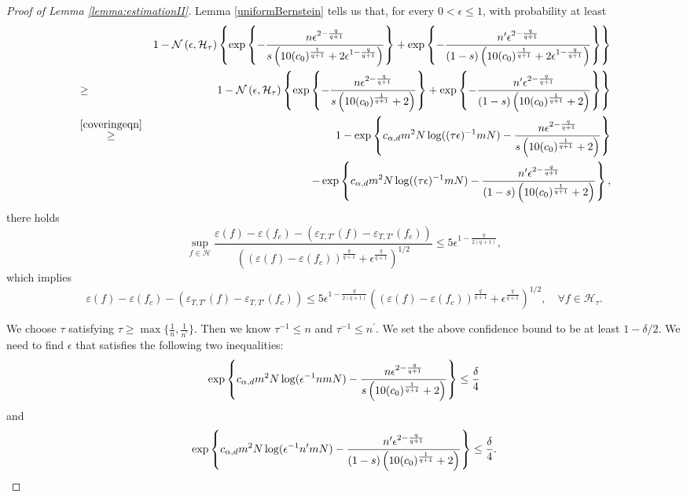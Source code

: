 \documentclass[10pt,a4paper]{amsart}
\begin{document}
\begin{proof}[Proof of Lemma \ref{lemma:estimationII}]
    Lemma \ref{uniformBernstein} tells us that, for every $0<\epsilon \leq 1$, with probability at least 
    \begin{eqnarray*}
&&1-  {\mathcal N}\left(\epsilon, {\mathcal H_\tau}\right) \left\{\exp \left\{-
{n \epsilon^{2-{\frac{q}{q+1}}} \over s\left(10 (c_0)^{\frac{1}{q+1}} +2 \epsilon^{1-{\frac{q}{q+1}}}\right)}\right\}
+\exp \left\{-
{n' \epsilon^{2-{\frac{q}{q+1}}} \over (1-s) \left(10 (c_0)^{\frac{1}{q+1}} +2 \epsilon^{1-{\frac{q}{q+1}}}\right)}\right\}\right\}\\
&\geq& 1-  {\mathcal N}\left(\epsilon, {\mathcal H_\tau}\right) \left\{\exp \left\{-
{n \epsilon^{2-{\frac{q}{q+1}}} \over s\left(10 (c_0)^{\frac{1}{q+1}} +2 \right)}\right\} +\exp \left\{-
{n' \epsilon^{2-{\frac{q}{q+1}}} \over (1-s) \left(10 (c_0)^{\frac{1}{q+1}} +2 \right)}\right\}\right\}\\
&\stackrel{\eqref{coveringeqn}}{\geq}& 1- \exp \left\{c_{\alpha, d} m^2 N \log ((\tau\epsilon)^{-1}mN) -
{n \epsilon^{2-{\frac{q}{q+1}}} \over s\left(10 (c_0)^{\frac{1}{q+1}} +2 \right)}\right\}\\
&& -\exp \left\{c_{\alpha, d} m^2 N \log ((\tau\epsilon)^{-1}mN)-
{n' \epsilon^{2-{\frac{q}{q+1}}} \over (1-s) \left(10 (c_0)^{\frac{1}{q+1}} +2 \right)}\right\} ,
\end{eqnarray*} 
there holds
$$\sup_{f\in {\mathcal H}} \frac{\varepsilon (f) - \varepsilon (f_c) - \left(\varepsilon_{T, T'} (f) - \varepsilon_{T, T'} (f_c)\right)}{\left(\left(\varepsilon (f) - \varepsilon (f_c)\right)^{\frac{q}{q+1}} + \epsilon^{\frac{q}{q+1}}\right)^{1/2}} \leq 5 \epsilon^{1-{\frac{q}{2(q+1)}}},
$$
which implies 
\begin{equation}\label{5epsilon}
    \varepsilon (f) - \varepsilon (f_c) - \left(\varepsilon_{T, T'} (f) - \varepsilon_{T, T'} (f_c)\right)\leq 5 \epsilon^{1-{\frac{q}{2(q+1)}}}\left(\left(\varepsilon (f) - \varepsilon (f_c)\right)^{\frac{q}{q+1}} + \epsilon^{\frac{q}{q+1}}\right)^{1/2}, \quad \forall f\in \mathcal{H}_\tau. 
\end{equation}

We choose $\tau$ satisfying $\tau \geq \max\{\frac{1}{n}, \frac{1}{n^\prime}\}$.
Then we know $\tau^{-1} \leq n$ and $\tau^{-1} \leq n^\prime$.
We set the above confidence bound to be at least $1-\delta/2$. We need to find $\epsilon$ that satisfies the following two inequalities:
$$\exp \left\{c_{\alpha, d} m^2 N \log (\epsilon^{-1}nmN) -
{n \epsilon^{2-{\frac{q}{q+1}}} \over s\left(10 (c_0)^{\frac{1}{q+1}} +2 \right)}\right\} \leq \frac{\delta}{4}$$
and 
$$\exp \left\{c_{\alpha, d} m^2 N \log (\epsilon^{-1}n^\prime mN)-
{n' \epsilon^{2-{\frac{q}{q+1}}} \over (1-s) \left(10 (c_0)^{\frac{1}{q+1}} +2 \right)}\right\} \leq \frac{\delta}{4}.$$ 


\end{proof}
\end{document}

